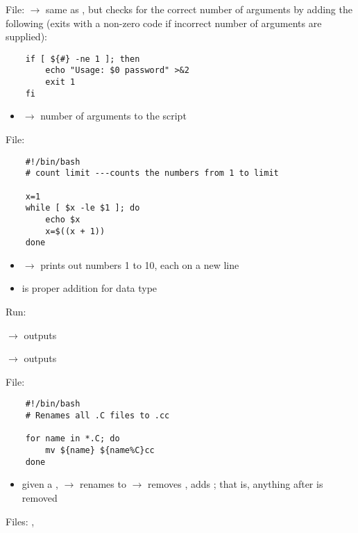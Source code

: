File:  $ \rightarrow $ same as ,
but checks for the correct number of arguments by adding the following
(exits with a non-zero code if incorrect number of arguments are supplied):

\begin{lstlisting}
    if [ ${#} -ne 1 ]; then
        echo "Usage: $0 password" >&2
        exit 1
    fi
\end{lstlisting}

\begin{itemize}
      \item \code{\$\{\#\}} $ \rightarrow $ number of arguments to the script
\end{itemize}

File: 
\begin{lstlisting}
    #!/bin/bash
    # count limit ---counts the numbers from 1 to limit

    x=1
    while [ $x -le $1 ]; do
        echo $x
        x=$((x + 1))
    done
\end{lstlisting}
\begin{itemize}
      \item {} $ \rightarrow $ prints out numbers 1 to 10,
            each on a new line
      \item {} is proper addition for  data type
\end{itemize}

Run: 

 $ \rightarrow $ outputs 

 $ \rightarrow $ outputs 

File: 

\begin{lstlisting}
    #!/bin/bash
    # Renames all .C files to .cc
    
    for name in *.C; do
        mv ${name} ${name%C}cc
    done
\end{lstlisting}
\begin{itemize}
      \item given a , 
            $ \rightarrow $ renames 
            to  $ \rightarrow $ removes , adds ; that is,
            anything after \code{\%} is removed
\end{itemize}

Files: , 

